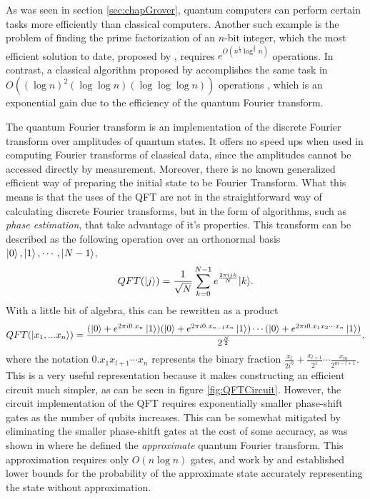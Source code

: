 \documentclass[../../dissertation.tex]{subfiles}
\begin{document}
As was seen in section \ref{sec:chapGrover}, quantum computers can perform certain tasks more efficiently than classical computers. Another such example is the problem of finding the prime factorization of an $n$-bit integer, which the most efficient solution to date, proposed by \cite{Pollard93}, requires $e^{O(n^{\frac{1}{3}}\log^{\frac{2}{3}}n)}$ operations. In contrast, a classical algorithm proposed by \cite{Coppersmith94} accomplishes the same task in $O((\log n)^2 (\log \log n) (\log \log \log n))$ operations , which is an exponential gain due to the efficiency of the quantum Fourier transform.\par
The quantum Fourier transform is an implementation of the discrete Fourier transform over amplitudes of quantum states. It offers no speed ups when used in computing Fourier transforms of classical data, since the amplitudes cannot be accessed directly by measurement. Moreover, there is no known generalized efficient way of preparing the initial state to be Fourier Transform. What this means is that the uses of the QFT are not in the straightforward way of calculating discrete Fourier transforms, but in the form of algorithms, such as \textit{phase estimation}, that take advantage of it's properties. This transform can be described as the following operation over an orthonormal basis $\ket{0}, \ket{1},\cdots,\ket{N-1}$,
\begin{equation}
	QFT(\ket{j}) = \frac{1}{\sqrt{N}} \sum_{k=0}^{N-1} e^{\frac{2\pi i j k}{N}} {\ket{k}}.
\end{equation}
With a little bit of algebra, this can be rewritten as a product
\begin{equation}
	\label{eq:QFTCircuitRep}
	QFT(\ket{x_1,...x_n})  =\frac{(\ket{0} + e^{2 \pi i 0.x_n} \ket{1}) (\ket{0} + e^{2 \pi i 0.x_{n-1}x_n} \ket{1})\cdots  (\ket{0} + e^{2 \pi i 0.x_1x_2\cdots x_n} \ket{1})}{2^{\frac{N}{2}}},
\end{equation}
where the notation $0.x_1x_{l+1}\cdots x_n$ represents the binary fraction $\frac{x_l}{2i^0}+\frac{x_{l+1}}{2^1} \cdots \frac{x_m}{2^{m-l+1}}$. This is a very useful representation because it makes constructing an efficient circuit much simpler, as can be seen in figure \ref{fig:QFTCircuit}. However, the circuit implementation of the QFT requires exponentially smaller phase-shift gates as the number of qubits increases. This can be somewhat mitigated by eliminating the smaller phase-shitft gates at the cost of some accuracy, as was shown in \cite{Coppersmith94} where he defined the \textit{approximate} quantum Fourier transform. This approximation requires only $O(n \log n)$ gates, and work by \cite{Barenco96} and \cite{Cheung2004} established lower bounds for the probability of the approximate state accurately representing the state without approximation. 
\end{document}
